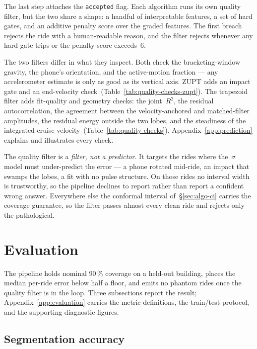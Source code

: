 \documentclass[manuscript,review,screen]{acmart}
\begin{document}
The last step attaches the \texttt{accepted} flag.  Each algorithm
runs its own quality filter, but the two share a shape: a handful of
interpretable features, a set of hard gates, and an additive penalty
score over the graded features.  The first breach rejects the ride
with a human-readable reason, and the filter rejects whenever any
hard gate trips or the penalty score exceeds~$6$.

The two filters differ in what they inspect.  Both check the
bracketing-window gravity, the phone's orientation, and the
active-motion fraction --- any accelerometer estimate is only as good
as its vertical axis.  ZUPT adds an impact gate and an end-velocity
check~(Table~\ref{tab:quality-checks-zupt}).  The trapezoid filter
adds fit-quality and geometry checks: the joint~$R^{2}$, the residual
autocorrelation, the agreement between the velocity-anchored and
matched-filter amplitudes, the residual energy outside the two lobes,
and the steadiness of the integrated cruise
velocity~(Table~\ref{tab:quality-checks}).
Appendix~\ref{app:prediction} explains and illustrates every check.

The quality filter is a \emph{filter, not a predictor}.  It targets
the rides where the~$\sigma$ model must under-predict the error --- a
phone rotated mid-ride, an impact that swamps the lobes, a fit with
no pulse structure.  On those rides no interval width is trustworthy,
so the pipeline declines to report rather than report a confident
wrong answer.  Everywhere else the conformal interval
of~\S\ref{sec:algo-ci} carries the coverage guarantee, so the filter
passes almost every clean ride and rejects only the pathological.

\section{Evaluation}
\label{sec:evaluation}

The pipeline holds nominal $90\,\%$ coverage on a held-out building,
places the median per-ride error below half a floor, and emits no
phantom rides once the quality filter is in the loop.  Three
subsections report the result; Appendix~\ref{app:evaluation} carries
the metric definitions, the train/test protocol, and the supporting
diagnostic figures.

\subsection{Segmentation accuracy}
\label{sec:eval-seg}
\end{document}
